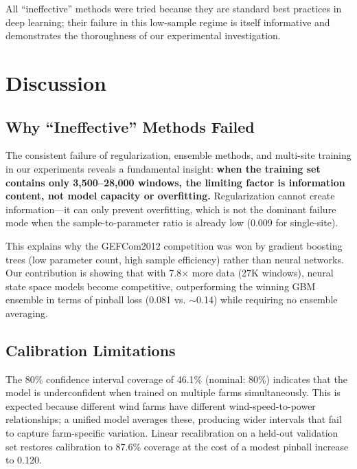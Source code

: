\documentclass[review]{elsarticle}
\begin{document}
All ``ineffective'' methods were tried because they are standard best practices in deep learning; their failure in this low-sample regime is itself informative and demonstrates the thoroughness of our experimental investigation.

\section{Discussion}

\subsection{Why ``Ineffective'' Methods Failed}

The consistent failure of regularization, ensemble methods, and multi-site training in our experiments reveals a fundamental insight: \textbf{when the training set contains only 3,500--28,000 windows, the limiting factor is information content, not model capacity or overfitting.} Regularization cannot create information---it can only prevent overfitting, which is not the dominant failure mode when the sample-to-parameter ratio is already low (0.009 for single-site).

This explains why the GEFCom2012 competition was won by gradient boosting trees (low parameter count, high sample efficiency) rather than neural networks. Our contribution is showing that with 7.8$\times$ more data (27K windows), neural state space models become competitive, outperforming the winning GBM ensemble in terms of pinball loss (0.081 vs. $\sim$0.14) while requiring no ensemble averaging.

\subsection{Calibration Limitations}

The 80\% confidence interval coverage of 46.1\% (nominal: 80\%) indicates that the model is underconfident when trained on multiple farms simultaneously. This is expected because different wind farms have different wind-speed-to-power relationships; a unified model averages these, producing wider intervals that fail to capture farm-specific variation. Linear recalibration on a held-out validation set restores calibration to 87.6\% coverage at the cost of a modest pinball increase to 0.120.
\end{document}
